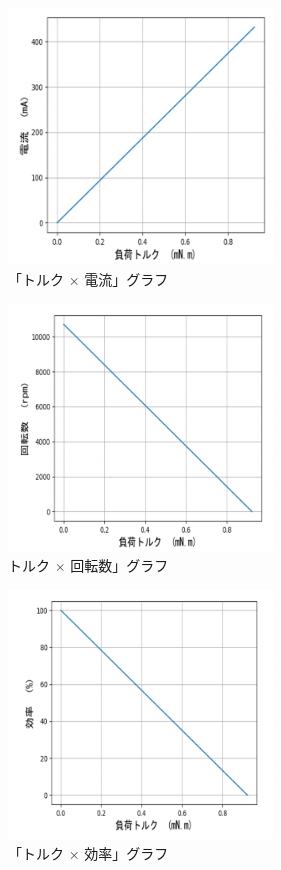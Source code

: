 \begin{figure}[t]
	\centering
	\includegraphics[width=7cm]{./Image/current.png}
	\caption{「トルク $\times$ 電流」グラフ}
	\label{fig:current}
\end{figure}
\begin{figure}[t]
	\centering
	\includegraphics[width=7cm]{./Image/speed.png}
	\caption{トルク $\times$ 回転数」グラフ}
	\label{fig:speed}
\end{figure}
\begin{figure}[t]
	\centering
	\includegraphics[width=7cm]{./Image/efficiency.png}
	\caption{「トルク $\times$ 効率」グラフ}
	\label{fig:effi}
\end{figure}
